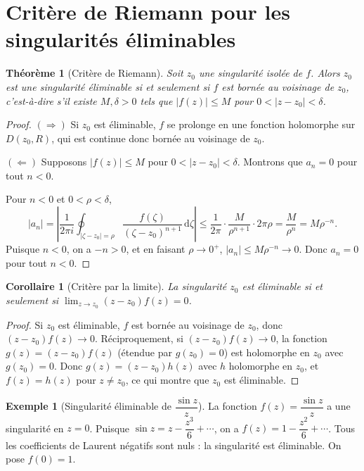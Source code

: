 \documentclass[12pt,a4paper,openany]{book}
\theoremstyle{definition}
\newtheorem{exemple}[definition]{Exemple}
\theoremstyle{plain}
\newtheorem{theoreme}[definition]{Théorème}
\newtheorem{corollaire}[definition]{Corollaire}
\theoremstyle{remark}
\newcommand{\dd}{\mathrm{d}}
\newcommand{\abs}[1]{\left|#1\right|}
\begin{document}
\section{Critère de Riemann pour les singularités éliminables}

\begin{theoreme}[Critère de Riemann]\label{thm:riemann-removable}
Soit $z_0$ une singularité isolée de $f$. Alors $z_0$ est une singularité
éliminable si et seulement si $f$ est bornée au voisinage de $z_0$,
c'est-à-dire s'il existe $M, \delta > 0$ tels que $\abs{f(z)} \leq M$
pour $0 < \abs{z - z_0} < \delta$.
\end{theoreme}

\begin{proof}
\noindent$(\Rightarrow)$ Si $z_0$ est éliminable, $f$ se prolonge en une
fonction holomorphe sur $D(z_0,R)$, qui est continue donc bornée au
voisinage de $z_0$.

\medskip
\noindent$(\Leftarrow)$ Supposons $\abs{f(z)} \leq M$ pour
$0 < \abs{z-z_0} < \delta$. Montrons que $a_n = 0$ pour tout $n < 0$.

Pour $n < 0$ et $0 < \rho < \delta$,
\[
  \abs{a_n} = \abs{\frac{1}{2\pi i}\oint_{\abs{\zeta - z_0}=\rho}
  \frac{f(\zeta)}{(\zeta - z_0)^{n+1}}\,\dd\zeta}
  \leq \frac{1}{2\pi}\cdot\frac{M}{\rho^{n+1}}\cdot 2\pi\rho
  = \frac{M}{\rho^n} = M\rho^{-n}.
\]
Puisque $n < 0$, on a $-n > 0$, et en faisant $\rho \to 0^+$,
$\abs{a_n} \leq M\rho^{-n} \to 0$. Donc $a_n = 0$ pour tout $n < 0$.
\end{proof}

\begin{corollaire}[Critère par la limite]\label{cor:removable-limit}
La singularité $z_0$ est éliminable si et seulement si
$\lim_{z \to z_0}(z - z_0)f(z) = 0$.
\end{corollaire}

\begin{proof}
Si $z_0$ est éliminable, $f$ est bornée au voisinage de $z_0$, donc
$(z-z_0)f(z) \to 0$. Réciproquement, si $(z-z_0)f(z) \to 0$, la
fonction $g(z) = (z-z_0)f(z)$ (étendue par $g(z_0) = 0$) est holomorphe
en $z_0$ avec $g(z_0) = 0$. Donc $g(z) = (z-z_0)h(z)$ avec $h$
holomorphe en $z_0$, et $f(z) = h(z)$ pour $z \neq z_0$, ce qui montre
que $z_0$ est éliminable.
\end{proof}

\begin{exemple}[Singularité éliminable de $\dfrac{\sin z}{z}$]\label{ex:sinz/z-removable}
La fonction $f(z) = \dfrac{\sin z}{z}$ a une singularité en $z = 0$.
Puisque $\sin z = z - \dfrac{z^3}{6} + \cdots$, on a
$f(z) = 1 - \dfrac{z^2}{6} + \cdots$. Tous les coefficients de Laurent
négatifs sont nuls : la singularité est éliminable. On pose $f(0) = 1$.
\end{exemple}
\end{document}
